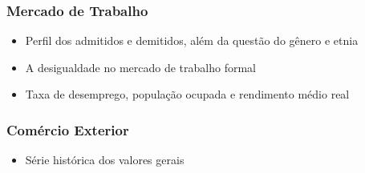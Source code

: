 \documentclass[12pt,aspectratio=169]{beamer}
\begin{document}
\begin{frame}
	\frametitle{Mercado de Trabalho}
\begin{itemize}
	\item Perfil dos admitidos e demitidos, além da questão do gênero e etnia
	\item A desigualdade no mercado de trabalho formal
	\item Taxa de desemprego, população ocupada e rendimento médio real
\end{itemize}

\begin{figure}%
	\centering
	\qquad
	
\end{figure}


\end{frame}

\begin{frame}
	\frametitle{Comércio Exterior}
	\begin{itemize}
		\item Série histórica dos valores gerais
	\end{itemize}

\begin{figure}%
	\centering
	
\end{figure}
\end{frame}
\end{document}
